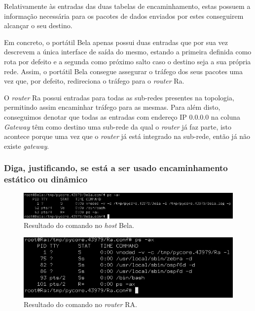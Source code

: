     \newpage
    \par Relativamente às entradas das duas tabelas de encaminhamento, estas possuem a informação necessária para os pacotes de dados enviados por estes conseguirem alcançar o seu destino. 
    
    \par Em concreto, o portátil Bela apenas possui duas entradas que por sua vez descrevem a única interface de saída do mesmo, estando a primeira definida como rota por defeito e a segunda como próximo salto caso o destino seja a sua própria rede. Assim, o portátil Bela consegue assegurar o tráfego dos seus pacotes uma vez que, por defeito, redireciona o tráfego para o \textit{router} Ra.
    
    \par O \textit{router} Ra possui entradas para todas as sub-redes presentes na topologia, permitindo assim encaminhar tráfego para as mesmas. Para além disto, conseguimos denotar que todas as entradas com endereço IP 0.0.0.0 na coluna \textit{Gateway} têm como destino uma sub-rede da qual o \textit{router} já faz parte, isto acontece porque uma vez que o \textit{router} já está integrado na sub-rede, então já não existe \textit{gateway}.
    
    
    

\paragraph{}
\subsubsection{Diga, justificando, se está a ser usado encaminhamento estático ou dinâmico}

    \begin{figure}[H]
    \includegraphics[width=\linewidth]{images/ParteII/Questao2/parteII-questao2-b-Bela.jpg}
    \caption{Resultado do comando no \textit{host} Bela.} \label{parteII-questao2-b-encaminhamentoBela}
    \end{figure} 
    
    \begin{figure}[H]
    \centering
    \includegraphics[width=400pt]{images/ParteII/Questao2/parteII-questao2-b-RA.jpg}
    \caption{Resultado do comando no \textit{router} RA.} \label{parteII-questao2-b-encaminhamentoRA}
    \end{figure} 
    
